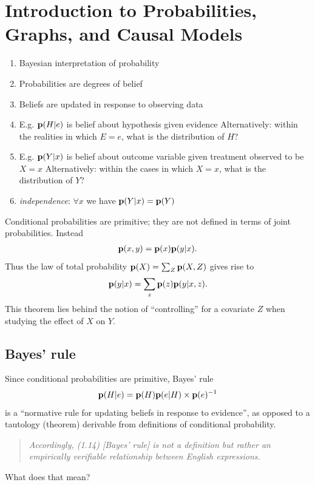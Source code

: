 \section{Introduction to Probabilities, Graphs, and Causal Models}

\begin{enumerate}
\item Bayesian interpretation of probability
\item Probabilities are degrees of belief
\item Beliefs are updated in response to observing data
\item E.g. $\mathbf{p}(H|e)$ is belief about hypothesis given evidence
  Alternatively: within the realities in which $E=e$, what is the distribution of $H$?
\item E.g. $\mathbf{p}(Y|x)$ is belief about outcome variable given treatment observed to be $X=x$
  Alternatively: within the cases in which $X=x$, what is the distribution of $Y$?
\item {\it independence}: $\forall x$ we have $\mathbf{p}(Y|x) = \mathbf{p}(Y)$
\end{enumerate}

Conditional probabilities are primitive; they are not defined in terms of joint probabilities. Instead
\begin{align*}
  \mathbf{p}(x, y) = \mathbf{p}(x)\mathbf{p}(y|x).
\end{align*}
Thus the law of total probability $\mathbf{p}(X) = \sum_Z\mathbf{p}(X, Z)$ gives rise to
\begin{align*}
  \mathbf{p}(y|x) = \sum_z \mathbf{p}(z)\mathbf{p}(y|x,z).
\end{align*}
This theorem lies behind the notion of ``controlling​'' for a covariate $Z$ when studying the effect of $X$ on $Y$.

\subsection{Bayes' rule}

Since conditional probabilities are primitive, Bayes' rule
\begin{align*}
  \mathbf{p}(H|e) = \mathbf{p}(H) \mathbf{p}(e|H) \times \mathbf{p}(e)^{-1}
\end{align*}
is a ``normative rule for updating beliefs in response to evidence​'', as opposed to a tautology (theorem) derivable from definitions of conditional probability.

\begin{quote}
  {\it Accordingly, (1.14) [Bayes' rule] is not a definition but rather an empirically verifiable relationship
    between English expressions.}
\end{quote}
\begin{question}
  What does that mean?
\end{question}


